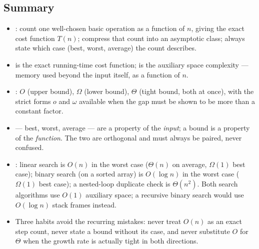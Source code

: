 \documentclass[11pt]{article}
\begin{document}
\subsection*{Summary}

\begin{itemize}
  \item {}: count one well-chosen basic operation as a
    function of $n$, giving the exact cost function $T(n)$; compress that
    count into an asymptotic class; always state which case (best, worst,
    average) the count describes.
  \item {} is the exact running-time cost function;
     is the auxiliary space complexity --- memory used beyond
    the input itself, as a function of $n$.
  \item {}: $O$ (upper bound), $\Omega$ (lower bound),
    $\Theta$ (tight bound, both at once), with the strict forms $o$ and
    $\omega$ available when the gap must be shown to be more than a
    constant factor.
  \item {} --- best, worst, average --- are a property of the
    \emph{input}; a bound is a property of the \emph{function}. The two are
    orthogonal and must always be paired, never confused.
  \item {}: linear search is $O(n)$ in the worst case
    ($\Theta(n)$ on average, $\Omega(1)$ best case); binary search (on a
    sorted array) is $O(\log n)$ in the worst case ($\Omega(1)$ best case);
    a nested-loop duplicate check is $\Theta(n^2)$. Both search algorithms
    use $O(1)$ auxiliary space; a recursive binary search would use
    $O(\log n)$ stack frames instead.
  \item Three habits avoid the recurring mistakes: never treat $O(n)$ as an
    exact step count, never state a bound without its case, and never
    substitute $O$ for $\Theta$ when the growth rate is actually tight in
    both directions.
\end{itemize}



\end{document}
